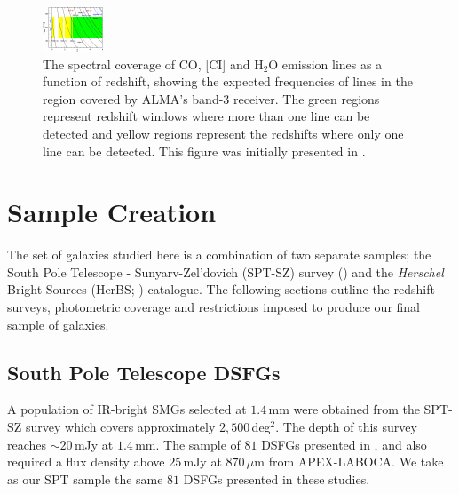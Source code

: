 \begin{figure}
	\centering
	\includegraphics[width=0.8\columnwidth]{Figures/Figure_4_1.pdf}
	\caption[Spectral coverage of molecular emission lines]{The spectral coverage of CO, [CI] and H$_2$O emission lines as a function of redshift, showing the expected frequencies of lines in the region covered by ALMA's band-3 receiver. The green regions represent redshift windows where more than one line can be detected and yellow regions represent the redshifts where only one line can be detected. This figure was initially presented in \citealt{Weiss_2013}.}
	\label{fig:redshift_ladder}
\end{figure}

\section{Sample Creation}

The set of galaxies studied here is a combination of two separate samples; the South Pole Telescope - Sunyarv-Zel'dovich (SPT-SZ) survey (\citealt{Vieira_2010, Mocanu_2013, Everett_2020}) and the \textit{Herschel} Bright Sources (HerBS; \citealt{Bakx_2018}) catalogue. The following sections outline the redshift surveys, photometric coverage and restrictions imposed to produce our final sample of galaxies.

\subsection{South Pole Telescope DSFGs}

A population of IR-bright SMGs selected at $1.4\,$mm were obtained from the SPT-SZ survey which covers approximately $2,500\,$deg$^2$. The depth of this survey reaches $\sim 20\,$mJy at $1.4\,$mm. The sample of $81$ DSFGs presented in \citealt{Weiss_2013}, \citealt{Strandet_2016} and \citealt{Reuter_2020} also required a flux density above $25\,$mJy at $870\,\mu$m from APEX-LABOCA. We take as our SPT sample the same $81$ DSFGs presented in these studies.

